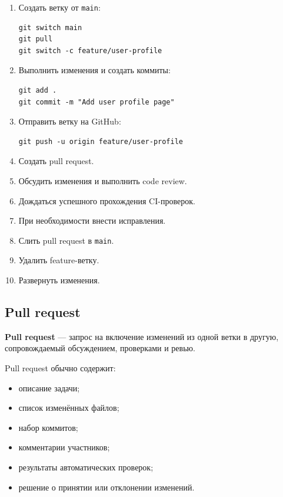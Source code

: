 \documentclass[12pt,a4paper]{article}
\begin{document}
\begin{enumerate}
    \item Создать ветку от \texttt{main}:
\begin{lstlisting}
git switch main
git pull
git switch -c feature/user-profile
\end{lstlisting}

    \item Выполнить изменения и создать коммиты:
\begin{lstlisting}
git add .
git commit -m "Add user profile page"
\end{lstlisting}

    \item Отправить ветку на GitHub:
\begin{lstlisting}
git push -u origin feature/user-profile
\end{lstlisting}

    \item Создать pull request.

    \item Обсудить изменения и выполнить code review.

    \item Дождаться успешного прохождения CI-проверок.

    \item При необходимости внести исправления.

    \item Слить pull request в \texttt{main}.

    \item Удалить feature-ветку.

    \item Развернуть изменения.
\end{enumerate}

\subsection{Pull request}

\textbf{Pull request} --- запрос на включение изменений из одной ветки в другую, сопровождаемый обсуждением, проверками и ревью.

Pull request обычно содержит:

\begin{itemize}
    \item описание задачи;
    \item список изменённых файлов;
    \item набор коммитов;
    \item комментарии участников;
    \item результаты автоматических проверок;
    \item решение о принятии или отклонении изменений.
\end{itemize}
\end{document}

